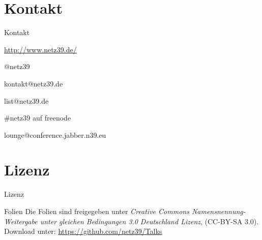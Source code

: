 \documentclass{beamer}
\begin{document}
\section{Kontakt}

\begin{frame}{Kontakt}
    \begin{center}
        \begin{description}
            \item[WWW] \url{http://www.netz39.de/}
            \item[Twitter] @netz39
            \item[E-Mail] kontakt@netz39.de
            \item[Mailingliste] list@netz39.de
            \item[IRC] \#netz39 auf freenode
            \item[XMPP MUC] lounge@conference.jabber.n39.eu
        \end{description}
    \end{center}
\end{frame}

\appendix

\section{Lizenz}

\begin{frame}{Lizenz}
    \begin{block}{Folien}
        Die Folien sind freigegeben unter \emph{Creative Commons
        Namensnennung-Weitergabe unter gleichen Bedingungen 3.0
        Deutschland Lizenz}, (CC-BY-SA 3.0). Download unter:
        \url{https://github.com/netz39/Talks}
    \end{block}
\end{frame}
\end{document}
